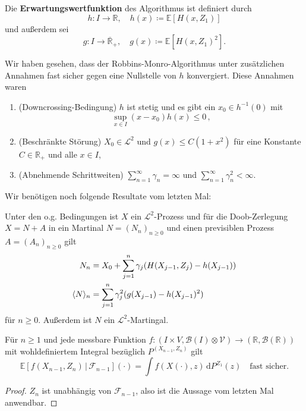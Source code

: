 \documentclass[ngerman,a4paper,11pt]{scrartcl}
\newcommand{\EE}{\mathbb{E}}
\newcommand{\RR}{\mathbb{R}}
\newcommand{\bb}{\mathcal{B}}
\newcommand{\ff}{\mathcal{F}}
\renewcommand{\ll}{\mathcal{L}}
\newcommand{\vv}{\mathcal{V}}
\newcommand{\zspace}{V}
\newcommand{\zsigma}{\vv}
\newcommand{\expect}[1]{\EE[#1]}
\newcommand{\condexp}[2]{\EE[#1\,|\,#2]}
\newcommand{\dvar}[1]{\,\mathrm{d}#1}
\DeclarePairedDelimiter{\sprod}{\langle}{\rangle}	%
\begin{document}
Die \textbf{Erwartungswertfunktion} des Algorithmus ist definiert durch
\begin{equation*}
 h:I\to\RR,\quad h(x)\coloneqq\expect{H(x,Z_1)}
\end{equation*}
und außerdem sei
\begin{equation*}
 g:I\to\overline{\RR}_+,\quad g(x)\coloneqq\expect{H(x,Z_1)^2}.
\end{equation*}

\begin{rem}
  \label{rem:11.2}
  Wir haben gesehen, dass der Robbins-Monro-Algorithmus unter zusätzlichen
  Annahmen fast sicher gegen eine Nullstelle von $h$ konvergiert. Diese Annahmen
  waren
  \begin{enumerate}[label=(\alph*)]
  \item (Downcrossing-Bedingung) $h$ ist stetig und es gibt ein $x_0\in
    h^{-1}(0)$ mit
    \begin{equation*}
      \sup_{x\in I}(x-x_0)h(x)\leq 0\,,
    \end{equation*}
  \item (Beschränkte Störung) $X_0\in\ll^2$ und $g(x)\leq C(1+x^2)$ für eine
    Konstante $C\in\RR_+$ und alle $x\in I$,\label{rem:beschr}
  \item (Abnehmende Schrittweiten) $\sum_{n=1}^\infty \gamma_n=\infty$ und
    $\sum_{n=1}^\infty\gamma_n^2<\infty$.
  \end{enumerate}
\end{rem}
Wir benötigen noch folgende Resultate vom letzten Mal:
\begin{lem}\label{lem:doob}
 Unter den o.g. Bedingungen ist $X$ ein $\ll^2$-Prozess und für die
 Doob-Zerlegung $X=N+A$ in ein Martinal $N=(N_n)_{n\geq 0}$ und einen
 previsiblen Prozess $A=(A_n)_{n\geq 0}$ gilt
 \begin{align*}
  N_n&=X_0+\sum_{j=1}^n\gamma_j(H(X_{j-1},Z_j)-h(X_{j-1})) \\
  \sprod{N}_n&=\sum_{j=1}^n\gamma_j^2(g(X_{j-1})-h(X_{j-1})^2)
 \end{align*}
 für $n\geq 0$. Außerdem ist $N$ ein $\ll^2$-Martingal.
\end{lem}
\begin{lem}\label{lem:subst}
 Für $n\geq 1$ und jede messbare Funktion $f:(I\times \zspace,\bb(I)\otimes\zsigma)\to(\RR,\bb(\RR))$ mit
 wohldefiniertem Integral bezüglich $P^{(X_{n-1},Z_n)}$ gilt
 \begin{equation*}
  \condexp{f(X_{n-1}, Z_n)}{\ff_{n-1}}(\cdot)=\int f(X(\cdot), z)\dvar{P^{Z_1}(z)}\quad\text{fast sicher.}
 \end{equation*}
\end{lem}
\begin{proof}
 $Z_n$  ist unabhängig von $\ff_{n-1}$, also ist die Aussage vom letzten Mal anwendbar.
\end{proof}
\end{document}
